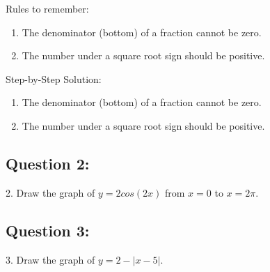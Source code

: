\documentclass[12pt, letterpaper]{article}
\begin{document}
Rules to remember:
\begin{enumerate}
  \item The denominator (bottom) of a fraction cannot be zero.
  \item The number under a square root sign should be positive.
\end{enumerate}

Step-by-Step Solution:
\begin{enumerate}
  \item The denominator (bottom) of a fraction cannot be zero.
  \item The number under a square root sign should be positive.
\end{enumerate}

\subsection{Question 2:}

2. Draw the graph of $y=2cos(2x)$ from $x=0$ to $x=2\pi$.

\subsection{Question 3:}

3. Draw the graph of $y=2-|x-5|$.
\end{document}
